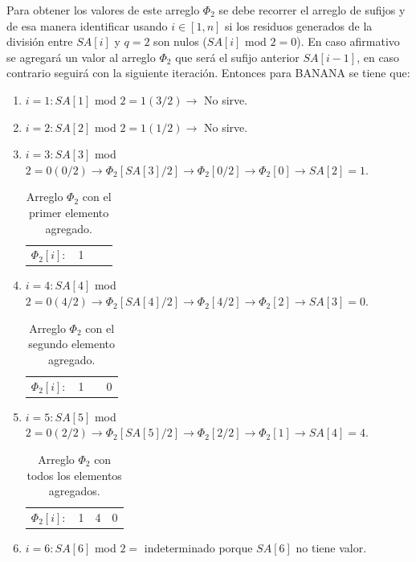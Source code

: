 Para obtener los valores de este arreglo $\Phi_{2}$ se debe recorrer el arreglo de sufijos y de esa manera identificar usando $i \in [1,n]$ si los residuos generados de la división entre $SA[i]$ y $q=2$ son nulos ($SA[i]$ mod $2 = 0$). En caso afirmativo se agregará un valor al arreglo $\Phi_{2}$ que será el sufijo anterior $SA[i-1]$, en caso contrario seguirá con la siguiente iteración. Entonces para BANANA se tiene que:

\begin{enumerate}

\item $i = 1: SA[1]$ mod $2 = 1 (3/2) \rightarrow$ No sirve.
\item $i = 2: SA[2]$ mod $2 = 1 (1/2) \rightarrow$ No sirve.
\item $i = 3: SA[3]$ mod $2 = 0 (0/2) \rightarrow \Phi_{2}[SA[3]/2] \rightarrow \Phi_{2}[0/2] \rightarrow \Phi_{2}[0]\rightarrow SA[2] = 1$.

\begin{table}[!htb]
\centering
\begin{tabular}{c|c|c|c|}
\cline{2-4}
$\Phi_{2}[i]:$ & 1 &  & \\ \cline{2-4}
\end{tabular}
\caption{Arreglo $\Phi_{2}$ con el primer elemento agregado.}
\end{table}

\item $i = 4: SA[4]$ mod $2 = 0 (4/2) \rightarrow \Phi_{2}[SA[4]/2] \rightarrow \Phi_{2}[4/2] \rightarrow \Phi_{2}[2] \rightarrow SA[3] = 0$.

\begin{table}[!htb]
\centering
\begin{tabular}{c|c|c|c|}
\cline{2-4}
$\Phi_{2}[i]:$ & 1 &  & 0\\ \cline{2-4}
\end{tabular}
\caption{Arreglo $\Phi_{2}$ con el segundo elemento agregado.}
\end{table}

\item $i = 5: SA[5]$ mod $2 = 0 (2/2) \rightarrow \Phi_{2}[SA[5]/2] \rightarrow \Phi_{2}[2/2] \rightarrow \Phi_{2}[1] \rightarrow SA[4] = 4$.

\begin{table}[!htb]
\centering
\begin{tabular}{c|c|c|c|}
\cline{2-4}
$\Phi_{2}[i]:$ & 1 & 4 & 0\\ \cline{2-4}
\end{tabular}
\caption{Arreglo $\Phi_{2}$ con todos los elementos agregados.}
\end{table}

\item $i = 6: SA[6]$ mod $2 =$ indeterminado porque $SA[6]$ no tiene valor.

\end{enumerate}

